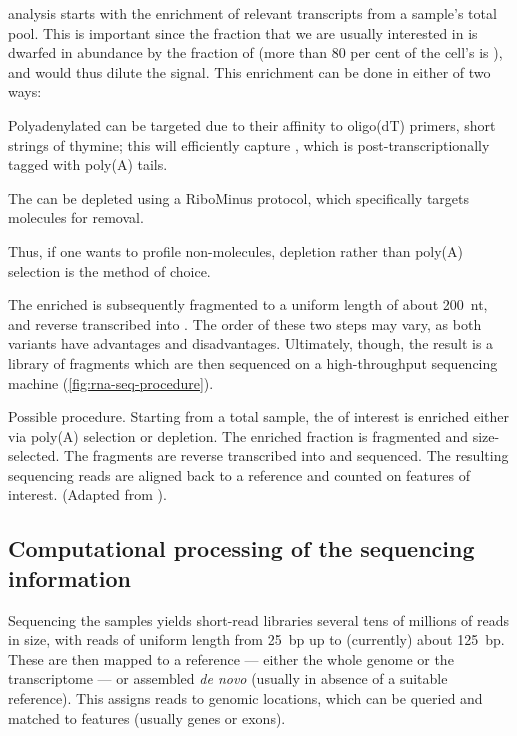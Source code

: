 \rnaseq analysis starts with the enrichment of relevant transcripts from a
sample’s total \rna pool. This is important since the \rna fraction that we are
usually interested in is dwarfed in abundance by the fraction of \rrna (more
than \num{80} per cent of the cell’s \rna is \rrna), and would thus dilute the
signal. This enrichment can be done in either of two ways:
\begin{enumerate*}
    \item Polyadenylated \rna can be targeted due to their affinity to oligo(dT)
        primers, short strings of thymine; this will efficiently capture \mrna,
        which is post-transcriptionally \threep tagged with poly(A) tails.
    \item The \rna can be \rrna depleted using a RiboMinus protocol, which
        specifically targets \rrna molecules for removal.
\end{enumerate*}
Thus, if one wants to profile non-\mrna molecules, \rrna depletion rather than
poly(A) selection is the method of choice.

The enriched \rna is subsequently fragmented to a uniform length of about
\SI{200}{nt}, and reverse transcribed into \cdna. The order of these two steps
may vary, as both variants have advantages and disadvantages. Ultimately,
though, the result is a \cdna library of fragments which are then sequenced on a
high-throughput sequencing machine (\cref{fig:rna-seq-procedure}).

    {Possible \rnaseq procedure.}
    {Starting from a total \rna sample, the \rna of interest is enriched either
    via poly(A) selection or \rrna depletion. The enriched fraction is
    fragmented and size-selected. The fragments are reverse transcribed into
    \cdna and sequenced. The resulting sequencing reads are aligned back to a
    reference and counted on features of interest. (Adapted from
    \citet{Mortazavi:2008}).}

\subsection{Computational processing of the sequencing information}

Sequencing the \rnaseq samples yields short-read libraries several tens of
millions of reads in size, with reads of uniform length from \SI{25}{bp} up to
(currently) about \SI{125}{bp}. These are then mapped to a reference --- either
the whole genome or the transcriptome --- or assembled \emph{de novo} (usually
in absence of a suitable reference). This assigns reads to genomic locations,
which can be queried and matched to features (usually genes or exons).

